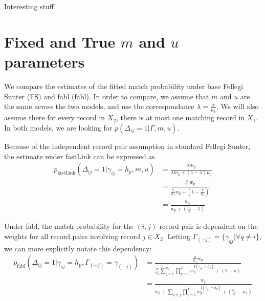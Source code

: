 \documentclass[12pt,letterpaper]{article}
\newcommand{\1}[1]{\mathbb{I}\!\left[#1\right]} %
\begin{document}
Interesting stuff!
\section{Fixed and True $m$ and $u$ parameters}

We compare the estimates of the fitted match probability under base Fellegi Sunter (FS) and fabl (fabl). In order to compare, we assume that $m$ and $u$ are the same across the two models, and use the correspondance $\lambda = \frac{\pi}{n_1}.$ We will also assume there for every record in $X_2$, there is at most one matching record in $X_1$. In both models, we are looking for $p(\Delta_{ij} = 1 | \Gamma, m, u)$. 

%

Because of the independent record pair assumption in standard Fellegi Sunter, the estimate under fastLink can be expressed as.
\begin{align*}
	p_{\text{fastLink}}(\Delta_{ij} = 1| \gamma_{ij} = h_p, m, u) &= \frac{\lambda m_p}{\lambda m_p + (1 - \lambda)u_p} \\
	&= \frac{\frac{\pi}{n_1} w_p}{\frac{\pi}{n_1} w_p + (1 - \frac{\pi}{n_1})} \\
	&= \frac{w_p}{w_p + (\frac{n_1}{\pi} - 1)}
\end{align*}

Under fabl, the match probability for the $(i, j)$ record pair is dependent on the weights for all record pairs involving record $j \in X_2$. Letting $\Gamma_{(-j)} = \{\gamma_{qj} | \forall q \neq i\}$, we can more explicitly notate this dependency:
\begin{align*}
	p_{\text{fabl}}(\Delta_{ij} = 1| \gamma_{ij} = h_p, \Gamma_{(-j)} = \gamma_{(-j)}) &= \frac{\frac{\pi}{n_1} w_p}{\frac{\pi}{n_1} \sum_{q = 1}^{n_1} \prod_{p = 1}^P w_p^{I(\gamma_{qj} = h_p)} + (1 - \pi)} \\
	&= \frac{w_p}{w_p  + \sum_{q \neq j} \prod_{p = 1}^P w_p^{I(\gamma_{qj} = h_p)} + (\frac{n_1}{\pi} - n_1)}
\end{align*}
\end{document}
